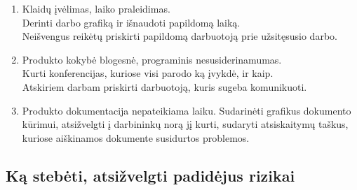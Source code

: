\documentclass[a4paper,12pt]{article}
\begin{document}
\begin{enumerate}
	\item Klaid\k u \k iv\. elimas, laiko praleidimas.\\
  		Derinti darbo grafiką ir i\v snaudoti papildom\k a laik\k a. \\
  		Neišvengus reik\. etų priskirti papildom\k a darbuotoj\k a prie u\v zsitęsusio darbo.
  		
  		
	\item Produkto kokybė blogesn\. e,	programinis nesusiderinamumas. \\ 
  		Kurti konferencijas, kuriose visi parodo k\k a \k ivykd\. e,  ir kaip. \\
  		Atskiriem darbam priskirti darbuotoj\k a, kuris sugeba komunikuoti.
  
	\item Produkto dokumentacija nepateikiama laiku.
  		Sudarin\. eti grafikus dokumento k\= urimui, atsi\v zvelgti \k i darbinink\k u nor\k a
  		j\k i kurti, sudaryti atsiskaitym\k u ta\v skus, kuriose ai\v skinamos dokumente 
  		susidurtos problemos.
  		
\end{enumerate}

\clearpage

\subsection{K\k a steb\. eti, atsi\v zvelgti padid\. ejus rizikai}
\end{document}
